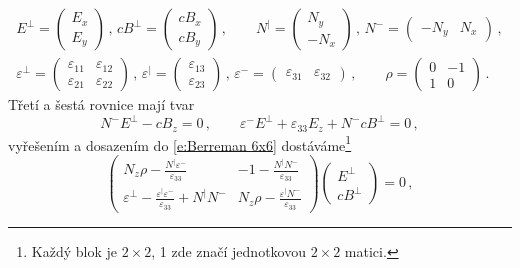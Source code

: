 \begin{align} \label{e:Berreman 6x6}
E^\perp = \begin{pmatrix}E_x \\ E_y\end{pmatrix}
\,, \, cB^\perp = \begin{pmatrix}cB_x \\ cB_y\end{pmatrix}
\,, \qquad N^\vert = \begin{pmatrix} N_y \\ -N_x \end{pmatrix}
\,, \, N^- = \begin{pmatrix} -N_y & N_x\end{pmatrix}
\,, \\ \varepsilon^\perp=\begin{pmatrix}\varepsilon_{11} & \varepsilon_{12} \\ \varepsilon_{21} & \varepsilon_{22}\end{pmatrix}
\,, \, \varepsilon^\vert=\begin{pmatrix} \varepsilon_{13} \\ \varepsilon_{23} \end{pmatrix}
\,, \, \varepsilon^-=\begin{pmatrix} \varepsilon_{31} & \varepsilon_{32} \end{pmatrix}
\,, \qquad \rho = \begin{pmatrix}0 & -1 \\ 1 & 0\end{pmatrix}
\,.
\end{align}
Třetí a šestá rovnice mají tvar
\begin{equation}
N^- E^\perp - cB_z=0 \,, \qquad \varepsilon^- E^\perp + \varepsilon_{33} E_z + N^- cB^\perp=0 \,,
\end{equation}
vyřešením a dosazením do \eqref{e:Berreman 6x6} dostáváme\footnote{Každý blok je $2\times 2$, 1 zde značí jednotkovou $2\times 2$ matici.}
\begin{equation}
\begin{pmatrix}
N_z \rho -\frac{N^\vert \varepsilon^-}{\varepsilon_{33}} & -1 - \frac{N^\vert N^- }{\varepsilon_{33}} \\
\varepsilon^\perp-\frac{\varepsilon^\vert \varepsilon^-}{\varepsilon_{33}}+N^\vert N^- & N_z \rho - \frac{\varepsilon^\vert N^-}{\varepsilon_{33}}
\end{pmatrix}
\begin{pmatrix} E^\perp \\ cB^\perp \end{pmatrix} = 0 \,,
\end{equation}

